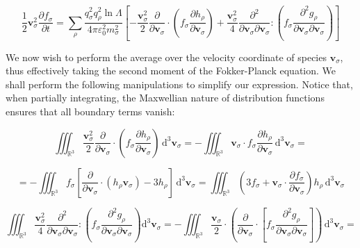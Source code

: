 \begin{equation}
    \frac{1}{2}\mathbf{v}_\sigma^2\frac{\partial f_\sigma}{\partial t}=\sum_{\rho}\frac{q_\sigma^2q_\rho^2\ln{\Lambda}}{4\pi\varepsilon_0^2m_\sigma^2}\left[-\frac{\mathbf{v}_\sigma^2}{2}\frac{\partial}{\partial\mathbf{v}_\sigma}\cdot\left(f_\sigma\frac{\partial h_\rho}{\partial\mathbf{v}_\sigma}\right)+\frac{\mathbf{v}_\sigma^2}{4}\frac{\partial^2}{\partial\mathbf{v}_\sigma\partial\mathbf{v}_\sigma}:\left(f_\sigma\frac{\partial^2g_\rho}{\partial\mathbf{v}_\sigma\partial\mathbf{v}_\sigma}\right)\right]
\end{equation}

\fi

We now wish to perform the average over the velocity coordinate of species $\mathbf{v}_\sigma$, thus effectively taking the second moment of the Fokker-Planck equation. We shall perform the following manipulations to simplify our expression. Notice that, when partially integrating, the Maxwellian nature of distribution functions ensures that all boundary terms vanish:

\begin{equation}
    \iiint_{\mathbb{R}^3}\frac{\mathbf{v}_\sigma^2}{2}\frac{\partial}{\partial\mathbf{v}_\sigma}\cdot\left(f_\sigma\frac{\partial h_\rho}{\partial\mathbf{v}_\sigma}\right)\,\mathrm{d}^3\mathbf{v}_\sigma=-\iiint_{\mathbb{R}^3}\mathbf{v}_\sigma\cdot f_\sigma\frac{\partial h_\rho}{\partial\mathbf{v}_\sigma}\,\mathrm{d}^3\mathbf{v}_\sigma=
\end{equation}

\begin{equation}
    =-\iiint_{\mathbb{R}^3}f_\sigma\left[\frac{\partial}{\partial\mathbf{v}_\sigma}\cdot(h_\rho\mathbf{v}_\sigma)-3h_\rho\right]\,\mathrm{d}^3\mathbf{v}_\sigma=\iiint_{\mathbb{R}^3}\left(3f_\sigma+\mathbf{v}_\sigma\cdot\frac{\partial f_\sigma}{\partial\mathbf{v}_\sigma}\right)h_\rho\,\mathrm{d}^3\mathbf{v}_\sigma
\end{equation}

\iffalse

\begin{equation}
    \iiint_{\mathbb{R}^3}\frac{\mathbf{v}_\sigma^2}{4}\frac{\partial^2}{\partial\mathbf{v}_\sigma\partial\mathbf{v}_\sigma}:\left(f_\sigma\frac{\partial^2g_\rho}{\partial\mathbf{v}_\sigma\partial\mathbf{v}_\sigma}\right)\mathrm{d}^3\mathbf{v}_\sigma=-\iiint_{\mathbb{R}^3}\frac{\mathbf{v}_\sigma}{2}\cdot\left(\frac{\partial}{\partial\mathbf{v}_\sigma}\cdot\left[f_\sigma\frac{\partial^2g_\rho}{\partial\mathbf{v}_\sigma\partial\mathbf{v}_\sigma}\right]\right)\,\mathrm{d}^3\mathbf{v}_\sigma=
\end{equation}

